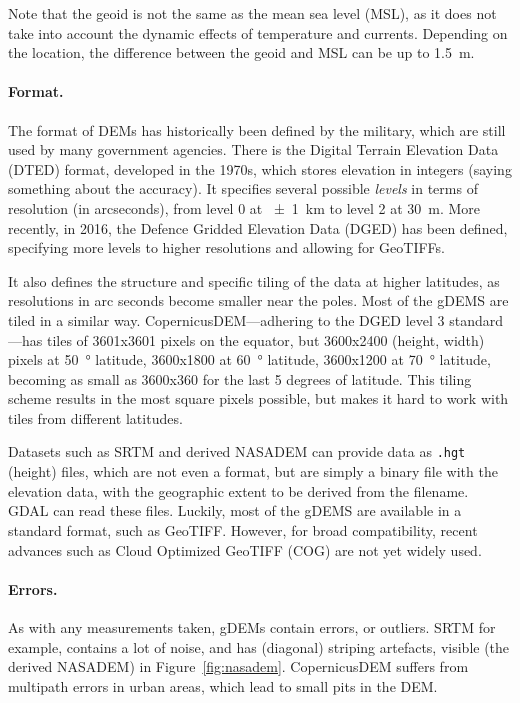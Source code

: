 Note that the geoid is not the same as the mean sea level (MSL), 
as it does not take into account the dynamic effects of temperature and currents.
Depending on the location, the difference between the geoid and MSL can be up to \qty{1.5}{m}.

\paragraph{Format.}  %
The format of DEMs has historically been defined by the military, which are still used by many government agencies.
There is the Digital Terrain Elevation Data (DTED) format, developed in the 1970s, which stores elevation in integers (saying something about the accuracy).
It specifies several possible \emph{levels} in terms of resolution (in arcseconds), from level 0 at \qty{\pm1}{km} to level 2 at \qty{30}{m}.
More recently, in 2016, the Defence Gridded Elevation Data (DGED) has been defined, specifying more levels to higher resolutions and allowing for GeoTIFFs.

It also defines the structure and specific tiling of the data at higher latitudes, as resolutions in arc seconds become smaller near the poles.
Most of the gDEMS are tiled in a similar way.
CopernicusDEM---adhering to the DGED level 3 standard---has tiles of 3601x3601 pixels on the equator, but 3600x2400 (height, width) pixels at \qty{50}{\degree} latitude, 3600x1800 at \qty{60}{\degree} latitude, 3600x1200 at \qty{70}{\degree} latitude, becoming as small as 3600x360 for the last 5 degrees of latitude.
This tiling scheme results in the most square pixels possible, but makes it hard to work with tiles from different latitudes.

Datasets such as SRTM and derived NASADEM can provide data as \texttt{.hgt} (height) files, which are not even a format, but are simply a binary file with the elevation data, with the geographic extent to be derived from the filename.
GDAL can read these files.
Luckily, most of the gDEMS are available in a standard format, such as GeoTIFF\@.
However, for broad compatibility, recent advances such as Cloud Optimized GeoTIFF (COG) are not yet widely used.


\paragraph{Errors.}
As with any measurements taken, gDEMs contain errors, or outliers.
SRTM for example, contains a lot of noise, and has (diagonal) striping artefacts, visible (the derived NASADEM) in Figure~\ref{fig:nasadem}.
CopernicusDEM suffers from multipath errors in urban areas, which lead to small pits in the DEM.

